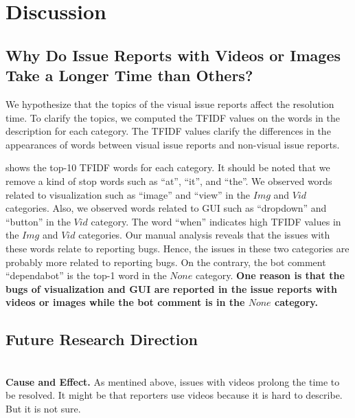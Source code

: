 \section{Discussion}
%

\subsection{Why Do Issue Reports with Videos or Images Take a Longer Time than Others?}
We hypothesize that the topics of the visual issue reports 
affect the resolution time. 
To clarify the topics, we computed the TFIDF values 
on the words in the description for each category. 
The TFIDF values clarify the differences in the appearances of 
words between visual issue reports and 
non-visual issue reports. 

 shows the top-10 TFIDF words
for each category.
It should be noted that we remove a kind of stop words such as 
``at'', ``it'', and ``the''. 
We observed words related to visualization such as 
``image'' and ``view'' in the $Img$ and $Vid$ categories. 
Also, we observed words related to GUI such as 
``dropdown'' and ``button'' in the $Vid$ category. 
The word ``when'' indicates high TFIDF values 
in the $Img$ and $Vid$ categories. 
Our manual analysis reveals that the issues with 
these words relate to reporting bugs. 
Hence, the issues in these two categories are 
probably more related to reporting bugs. 
On the contrary, the bot comment ``dependabot'' is 
the top-1 word in the $None$ category. 
\summarybox
{\bf  
One reason is that the bugs of visualization and GUI are 
reported in the issue reports with videos or images 
while the bot comment is in the $None$ category.  
}


\subsection{Future Research Direction}
\\

\noindent
\textbf{Cause and Effect. }
As mentined above, issues with videos prolong the time to be resolved. It might be that reporters use videos because it is hard to describe. But it is not sure. 

